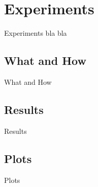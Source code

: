 \chapter{Experiments}
\label{chap:experim}
Experiments bla bla
\section{What and How}
What and How
\section{Results}
Results
\section{Plots}
Plots